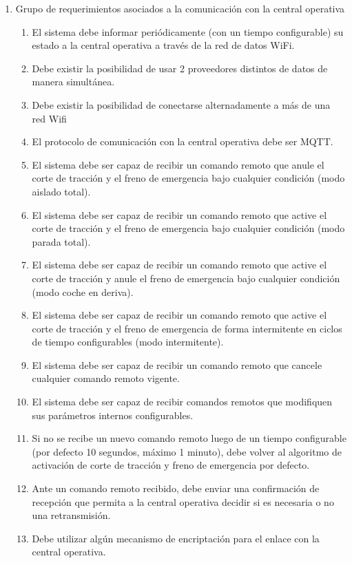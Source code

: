 \begin{enumerate}
    \item Grupo de requerimientos asociados a la comunicación con la central operativa
    \begin{enumerate}
        \item El sistema debe informar periódicamente (con un tiempo configurable) su estado a la central operativa a través de la red de datos WiFi.
        \item Debe existir la posibilidad de usar 2 proveedores distintos de datos de manera simultánea.
        \item Debe existir la posibilidad de conectarse alternadamente a más de una red Wifi
        \item El protocolo de comunicación con la central operativa debe ser MQTT.
        \item El sistema debe ser capaz de recibir un comando remoto que anule el corte de tracción y el freno de emergencia bajo cualquier condición (modo aislado total).
        \item El sistema debe ser capaz de recibir un comando remoto que active el corte de tracción y el freno de emergencia bajo cualquier condición (modo parada total).
        \item El sistema debe ser capaz de recibir un comando remoto que active el corte de tracción y anule el freno de emergencia bajo cualquier condición (modo coche en deriva).
        \item El sistema debe ser capaz de recibir un comando remoto que active el corte de tracción y el freno de emergencia de forma intermitente en ciclos de tiempo configurables (modo intermitente).
        \item El sistema debe ser capaz de recibir un comando remoto que cancele cualquier comando remoto vigente.
        \item El sistema debe ser capaz de recibir comandos remotos que modifiquen sus parámetros internos configurables.
        \item Si no se recibe un nuevo comando remoto luego de un tiempo configurable (por defecto 10 segundos, máximo 1 minuto), debe volver al algoritmo de activación de corte de tracción y freno de emergencia por defecto.
        \item Ante un comando remoto recibido, debe enviar una confirmación de recepción que permita a la central operativa decidir si es necesaria o no una retransmisión.
        \item Debe utilizar algún mecanismo de encriptación para el enlace con la central operativa.
    \end{enumerate}
       

\end{enumerate}
